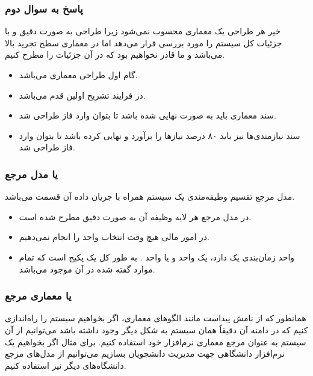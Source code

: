 \documentclass[a4paper]{article}
\begin{document}
\subsubsection*{پاسخ به سوال دوم}

خیر هر طراحی یک معماری محسوب نمی‌شود زیرا طراحی به صورت دقیق و با جزئیات کل
سیستم را مورد بررسی قرار می‌دهد اما در معماری سطح تجرید بالا می‌باشد و ما قادر
نخواهیم بود که در آن جزئیات را مطرح کنیم.

\begin{itemize}
    \item گام اول طراحی معماری می‌باشد.
    \item در  فرایند تشریح اولین قدم می‌باشد.
    \item سند معماری باید به صورت نهایی شده باشد تا بتوان وارد فاز طراحی شد.
    \item سند نیازمندی‌ها نیز باید ۸۰ درصد نیاز‌ها را برآورد و نهایی کرده باشد
    تا بتوان وارد فاز طراحی شد.
\end{itemize}

\subsubsection{ یا مدل مرجع}

مدل مرجع تقسیم وظیفه‌مندی یک سیستم همراه با جریان داده آن قسمت می‌باشد.

\begin{itemize}
    \item در مدل مرجع  هر لایه وظیفه آن به صورت دقیق مطرح شده است.
    \item در امور مالی هیچ وقت انتخاب واحد را انجام نمی‌دهیم.
    \item واحد زمان‌بندی یک  دارد، یک واحد  و یا واحد
    . به طور کل یک پکیج است که تمام موارد گفته شده در آن موجود
    می‌باشد.
\end{itemize}

\subsubsection{ یا معماری مرجع}

همانطور که از نامش پیداست مانند الگو‌های معماری، اگر بخواهیم سیستم را راه‌اندازی
کنیم که در دامنه آن دقیقاً همان سیستم به شکل دیگر وجود داشته باشد می‌توانیم از
آن سیستم به عنوان مرجع معماری نرم‌افزار خود استفاده کنیم. برای مثال اگر بخواهیم
یک نرم‌افزار دانشگاهی جهت مدیریت دانشجویان بسازیم می‌توانیم از مدل‌های مرجع
دانشگاه‌های دیگر نیز استفاده کنیم.
\end{document}

